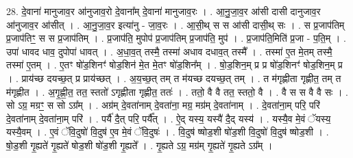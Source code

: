 \documentclass[17pt]{extarticle}
\begin{document}
28. दे॒वाना॑ मानुजाव॒र आ॑नुजाव॒रो दे॒वाना᳚म् दे॒वाना॑ मानुजाव॒रः । . आ॒नु॒जा॒व॒र आ॑सी दासी दानुजाव॒र आ॑नुजाव॒र आ॑सीत् । . आ॒नु॒जा॒व॒र इत्या॑नु - जा॒व॒रः । . आ॒सी॒थ् स स आ॑सी दासी॒थ् सः । . स प्र॒जाप॑तिम् प्र॒जाप॑तिꣳ॒॒ स स प्र॒जाप॑तिम् । . प्र॒जाप॑ति॒ मुपोप॑ प्र॒जाप॑तिम् प्र॒जाप॑ति॒ मुप॑ । . प्र॒जाप॑ति॒मिति॑ प्र॒जा - प॒ति॒म् । . उपा॑ धावद धाव॒ दुपोपा॑ धावत् । . अ॒धा॒व॒त् तस्मै॒ तस्मा॑ अधाव दधाव॒त् तस्मै᳚ । . तस्मा॑ ए॒त मे॒तम् तस्मै॒ तस्मा॑ ए॒तम् । . ए॒तꣳ षो॑ड॒शिनꣳ॑ षोड॒शिन॑ मे॒त मे॒तꣳ षो॑ड॒शिन᳚म् । . षो॒ड॒शिन॒म् प्र प्र षो॑ड॒शिनꣳ॑ षोड॒शिन॒म् प्र । . प्राय॑च्छ दयच्छ॒त् प्र प्राय॑च्छत् । . अ॒य॒च्छ॒त् तम् त म॑यच्छ दयच्छ॒त् तम् । . त म॑गृह्णीता गृह्णीत॒ तम् त म॑गृह्णीत । . अ॒गृ॒ह्णी॒त॒ तत॒ स्ततो॑ ऽगृह्णीता गृह्णीत॒ ततः॑ । . ततो॒ वै वै तत॒ स्ततो॒ वै । . वै स स वै वै सः । . सो ऽग्र॒ मग्रꣳ॒॒ स सो ऽग्र᳚म् । . अग्र॑म् दे॒वता॑नाम् दे॒वता॑ना॒ मग्र॒ मग्र॑म् दे॒वता॑नाम् । . दे॒वता॑ना॒म् परि॒ परि॑ दे॒वता॑नाम् दे॒वता॑ना॒म् परि॑ । . पर्यै॑ दै॒त् परि॒ पर्यै᳚त् । . ऐ॒द् यस्य॒ यस्यै॑ दै॒द् यस्य॑ । . यस्यै॒व मे॒वं ॅयस्य॒ यस्यै॒वम् । . ए॒वं ॅवि॒दुषो॑ वि॒दुष॑ ए॒व मे॒वं ॅवि॒दुषः॑ । . वि॒दुष॑ ष्षोड॒शी षो॑ड॒शी वि॒दुषो॑ वि॒दुष॑ ष्षोड॒शी । . षो॒ड॒शी गृ॒ह्यते॑ गृ॒ह्यते॑ षोड॒शी षो॑ड॒शी गृ॒ह्यते᳚ । . गृ॒ह्यते ऽग्र॒ मग्र॑म् गृ॒ह्यते॑ गृ॒ह्यते ऽग्र᳚म् । \newline
\end{document}
